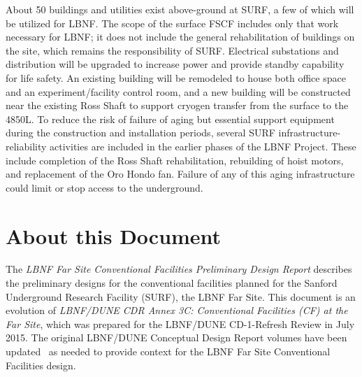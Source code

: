 About 50 buildings and utilities exist above-ground at SURF, a few of which will be utilized for LBNF. 
The scope of the surface FSCF includes only that work necessary for LBNF; it does not include the general rehabilitation of buildings on the site, which remains the responsibility of SURF. Electrical substations and distribution will be upgraded to increase power and provide standby capability for life safety. %
An existing building will be remodeled to house both office space and an experiment/facility control room, and a new building will be constructed near the existing Ross Shaft to support cryogen transfer from the surface to the 4850L. To reduce the risk of failure of aging but essential support equipment during the construction and installation periods, several SURF infrastructure-reliability activities are included in the earlier phases %
of the LBNF Project. These include completion of the Ross Shaft rehabilitation, rebuilding of hoist motors, and replacement of the Oro Hondo fan. Failure of any of this aging infrastructure could limit or stop access to the underground.


\section{About this Document}
\label{sec:pdr-org-fscf}

The \textit{LBNF Far Site Conventional Facilities Preliminary Design Report} describes the preliminary designs for the conventional facilities planned for the Sanford Underground Research Facility (SURF), the LBNF Far Site. This document is an evolution of \textit{LBNF/DUNE CDR Annex 3C: Conventional Facilities (CF) at the Far Site}, which was prepared for the LBNF/DUNE CD-1-Refresh Review in July 2015. 
The original LBNF/DUNE Conceptual Design Report volumes have been updated~\cite{design-doc-lbnf-dune, design-doc-dune-physics, design-doc-lbnf, design-doc-dune-det}  as needed to provide context for the LBNF Far Site Conventional Facilities design.


